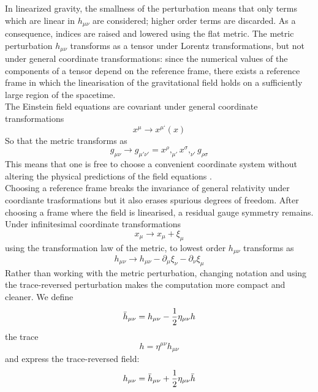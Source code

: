 \documentclass[binding=0.6cm, LaM]{sapthesis}
\begin{document}
	In linearized gravity, the smallness of the perturbation means that only terms which are linear in $h_{\mu\nu}$ are considered;
	higher order terms are discarded. As a consequence, indices are raised and lowered using the flat metric. 
	The metric perturbation $h_{\mu\nu}$ transforms as a tensor under Lorentz transformations, 
	but not under general coordinate transformations: since the numerical values of the components
	of a tensor depend on the reference frame, there exists a reference frame in which 
	the linearisation of the gravitational field holds on a sufficiently large region of the spacetime. \\
	The Einstein field equations are covariant under general coordinate transformations
		\begin{equation}
		x^{\mu} \rightarrow x^{\mu ‘}(x)
		\end{equation}
	So that the metric transforms as
		\begin{equation}
		g_{\mu\nu} \rightarrow g_{\mu' \nu'} = x^{\rho},_{\mu'}x^{\sigma},_{\nu'}g_{\rho \sigma}
		\end{equation}
	This means that one is free to choose a convenient coordinate system without 
	altering the physical predictions of the field equations \cite{16}. \\
	Choosing a reference frame breaks the invariance of general relativity under 
	coordiante trasformations but it also erases spurious degrees of freedom. 
	After choosing a frame where the field is linearised, 
	a residual gauge symmetry remains. \\
	Under infinitesimal coordinate transformations
                 \[
			x_{\mu} \rightarrow x_{\mu} + \xi_{\mu}
                \]
	using the transformation law of the metric, to lowest order $h_{\mu\nu}$ transforms as	
		\[
			h_{\mu\nu} \rightarrow h_{\mu\nu} - \partial_{\mu}\xi_{\nu} - \partial_{\nu}\xi_{\mu}
		\]
	Rather than working with the metric perturbation, changing notation and using the trace-reversed perturbation 
	makes the computation more compact and cleaner. We define
		\begin{equation}
			{\bar h}_{\mu\nu} = h_{\mu\nu} - {1 \over {2}}\eta_{\mu\nu}h  
		\end{equation}
	the trace
		\begin{equation}
			h = \eta^{\mu\nu}h_{\mu\nu}
		\end{equation}
	and express the trace-reversed field:
		\begin{equation}
			h_{\mu\nu} = {\bar h}_{\mu\nu} + {1 \over {2}}\eta_{\mu\nu}{\bar h}
		\end{equation}
\end{document}
